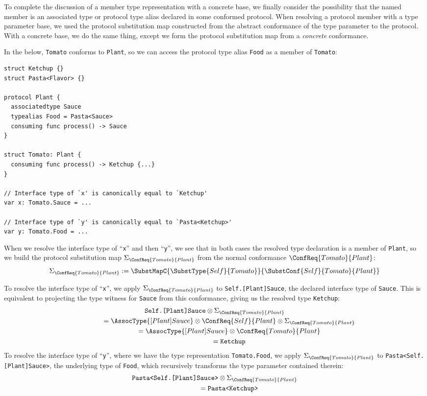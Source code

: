 \documentclass[../generics]{subfiles}
\begin{document}
To complete the discussion of a member type representation with a concrete base, we finally consider the possibility that the named member is an associated type or protocol type alias declared in some conformed protocol. When resolving a protocol member with a type parameter base, we used the protocol substitution map constructed from the abstract conformance of the type parameter to the protocol. With a concrete base, we do the same thing, except we form the protocol substitution map from a \emph{concrete} conformance.

In the below, \texttt{Tomato} conforms to \texttt{Plant}, so we can access the protocol type alias \texttt{Food} as a member of \texttt{Tomato}:
\begin{Verbatim}
struct Ketchup {}
struct Pasta<Flavor> {}

protocol Plant {
  associatedtype Sauce
  typealias Food = Pasta<Sauce>
  consuming func process() -> Sauce
}

struct Tomato: Plant {
  consuming func process() -> Ketchup {...}
}

// Interface type of `x' is canonically equal to `Ketchup'
var x: Tomato.Sauce = ...

// Interface type of `y' is canonically equal to `Pasta<Ketchup>'
var y: Tomato.Food = ...
\end{Verbatim}
When we resolve the interface type of ``\texttt{x}'' and then ``\texttt{y}'', we see that in both cases the resolved type declaration is a member of \texttt{Plant}, so we build the protocol substitution map $\Sigma_{\ConfReq{Tomato}{Plant}}$ from the normal conformance $\ConfReq{Tomato}{Plant}$:
\[\Sigma_{\ConfReq{Tomato}{Plant}} := \SubstMapC{\SubstType{Self}{Tomato}}{\SubstConf{Self}{Tomato}{Plant}}\]

To resolve the interface type of ``\texttt{x}'', we apply $\Sigma_{\ConfReq{Tomato}{Plant}}$ to \texttt{Self.[Plant]Sauce}, the declared interface type of \texttt{Sauce}. This is equivalent to projecting the type witness for \texttt{Sauce} from this conformance, giving us the resolved type \texttt{Ketchup}:
\begin{gather*}
\texttt{Self.[Plant]Sauce} \otimes \Sigma_{\ConfReq{Tomato}{Plant}}\\
\qquad\qquad {} = \AssocType{[Plant]Sauce} \otimes \ConfReq{Self}{Plant} \otimes \Sigma_{\ConfReq{Tomato}{Plant}}\\
\qquad\qquad {} = \AssocType{[Plant]Sauce} \otimes \ConfReq{Tomato}{Plant}\\
\qquad\qquad {} = \texttt{Ketchup}
\end{gather*}
To resolve the interface type of ``\texttt{y}'', where we have the type representation \texttt{Tomato.Food}, we apply $\Sigma_{\ConfReq{Tomato}{Plant}}$ to \texttt{Pasta<Self.[Plant]Sauce>}, the underlying type of \texttt{Food}, which recursively transforms the type parameter contained therein:
\begin{gather*}
\texttt{Pasta<Self.[Plant]Sauce>} \otimes \Sigma_{\ConfReq{Tomato}{Plant}}\\
\qquad\qquad {} = \texttt{Pasta<Ketchup>}
\end{gather*}
\end{document}
